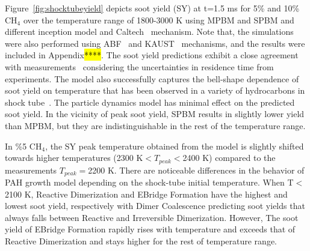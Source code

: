 

Figure~\ref{fig:shocktubeyield} depicts soot yield (SY) at t=1.5 ms for 5\% and 10\% $\mathrm{CH_4}$ over the temperature range of 1800-3000 K using MPBM and SPBM and different inception model and Caltech~\citep{blanquart2009chemical} mechanism. Note that, the simulations were also performed using ABF~\citep{appel2000kinetic} and KAUST~\cite{wang2013pah} mechanisms, and the results were included in Appendix\hl{****}. The soot yield predictions exhibit a close agreement with measurements~\citep{agafonov2016unified} considering the uncertainties in residence time from experiments. The model also successfully captures the bell-shape dependence of soot yield on temperature that has been observed in a variety of hydrocarbons in shock tube~\citep{kellerer1996soot,knorre1996soot}. The particle dynamics model has minimal effect on the predicted soot yield. In the vicinity of peak soot yield, SPBM results in slightly lower yield than MPBM, but they are indistinguishable in the rest of the temperature range. 

In \%5 $\mathrm{CH_4}$, the SY peak temperature obtained from the model is slightly shifted towards higher temperatures (2300 K$<T_{peak}<$2400 K) compared to the measurements $T_{peak}=$2200 K. There are noticeable differences in the behavior of PAH growth model depending on the shock-tube initial temperature. When T$<$2100 K, Reactive Dimerization and EBridge Formation have the highest and lowest soot yield, respectively with Dimer Coalescence predicting soot yields that always falls between Reactive and Irreversible Dimerization. However, The soot yield of EBridge Formation rapidly rises with temperature and exceeds that of Reactive Dimerization and stays higher for the rest of temperature range.

